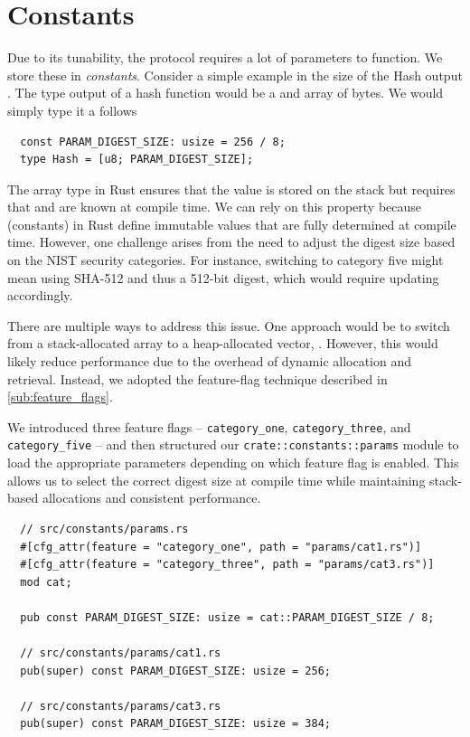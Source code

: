 \documentclass[11pt]{report}
\theoremstyle{definition}
\theoremstyle{plain}
\begin{document}
\section{Constants}\label{sub:constants}
Due to its tunability, the protocol requires a lot of parameters to function. We store these in \textit{constants}. Consider a simple example in the size of the Hash output . The type output of a hash function would be a and array of bytes. We would simply type it a follows

\begin{verbatim}
  const PARAM_DIGEST_SIZE: usize = 256 / 8;
  type Hash = [u8; PARAM_DIGEST_SIZE];
\end{verbatim}

The \rust{[T; N]} array type in Rust ensures that the value is stored on the stack but requires that  and  are known at compile time. We can rely on this property because  (constants) in Rust define immutable values that are fully determined at compile time. However, one challenge arises from the need to adjust the digest size based on the NIST security categories. For instance, switching to category five might mean using SHA-512 and thus a 512-bit digest, which would require updating  accordingly.

There are multiple ways to address this issue. One approach would be to switch from a stack-allocated array to a heap-allocated vector, . However, this would likely reduce performance due to the overhead of dynamic allocation and retrieval. Instead, we adopted the feature-flag technique described in \autoref{sub:feature_flags}.

We introduced three feature flags -- \texttt{category\_one}, \texttt{category\_three}, and \texttt{category\_five} -- and then structured our \texttt{crate::constants::params} module to load the appropriate parameters depending on which feature flag is enabled. This allows us to select the correct digest size at compile time while maintaining stack-based allocations and consistent performance.

\begin{verbatim}
  // src/constants/params.rs 
  #[cfg_attr(feature = "category_one", path = "params/cat1.rs")]
  #[cfg_attr(feature = "category_three", path = "params/cat3.rs")]
  mod cat; 

  pub const PARAM_DIGEST_SIZE: usize = cat::PARAM_DIGEST_SIZE / 8;

  // src/constants/params/cat1.rs
  pub(super) const PARAM_DIGEST_SIZE: usize = 256;

  // src/constants/params/cat3.rs
  pub(super) const PARAM_DIGEST_SIZE: usize = 384;
\end{verbatim}
\end{document}
